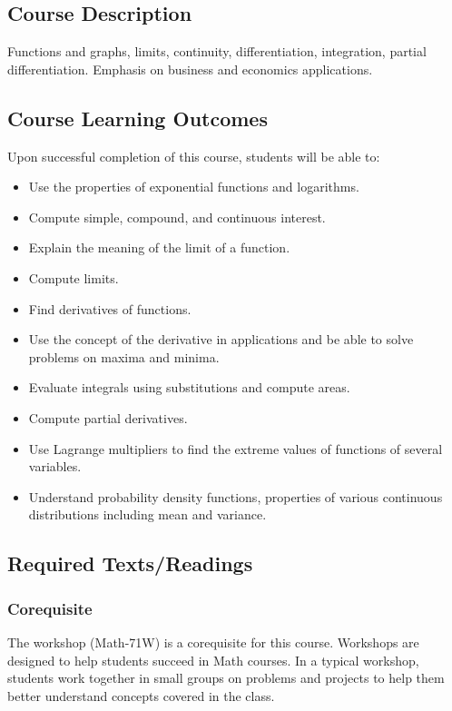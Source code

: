 \documentclass[letterpaper,12pt,fleqn]{article}
\begin{document}
\subsection*{Course Description}

Functions and graphs, limits, continuity, differentiation, integration, partial differentiation. Emphasis on
business and economics applications.

\subsection*{Course Learning Outcomes}

Upon successful completion of this course, students will be able to:
\begin{itemize}
\item Use the properties of exponential functions and logarithms.
\item Compute simple, compound, and continuous interest.
\item Explain the meaning of the limit of a function.
\item Compute limits.
\item Find derivatives of functions.
\item Use the concept of the derivative in applications and be able to solve problems on maxima and minima.
\item Evaluate integrals using substitutions and compute areas.
\item Compute partial derivatives.
\item Use Lagrange multipliers to find the extreme values of functions of several variables.
\item Understand probability density functions, properties of various continuous distributions including mean and
  variance.
\end{itemize}

\subsection*{Required Texts/Readings}

\subsubsection*{Corequisite}

The workshop (Math-71W) is a corequisite for this course.  Workshops are designed to help students succeed in Math
courses.  In a typical workshop, students work together in small groups on problems and projects to help them
better understand concepts covered in the class.
\end{document}
